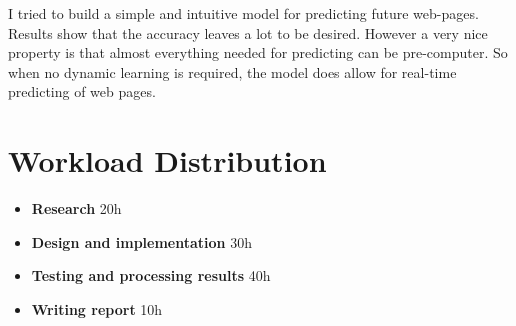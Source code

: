 \documentclass{article}
\begin{document}
I tried to build a simple and intuitive model for predicting future web-pages.
Results show that the accuracy leaves a lot to be desired.
However a very nice property is that almost everything needed for predicting can be pre-computer.
So when no dynamic learning is required, the model does allow for real-time predicting of web pages.

\section{Workload Distribution}

\begin{itemize}
    \item \textbf{Research} 20h
    \item \textbf{Design and implementation} 30h
    \item \textbf{Testing and processing results} 40h
    \item \textbf{Writing report} 10h
\end{itemize}



\end{document}
